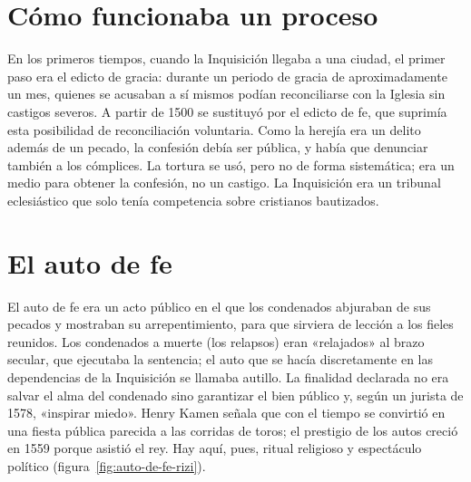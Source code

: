 \documentclass{book}
\begin{document}

\section{Cómo funcionaba un proceso}

En los primeros tiempos, cuando la Inquisición llegaba a una ciudad, el primer paso era el edicto de gracia: durante un periodo de gracia de aproximadamente un mes, quienes se acusaban a sí mismos podían reconciliarse con la Iglesia sin castigos severos. A partir de 1500 se sustituyó por el edicto de fe, que suprimía esta posibilidad de reconciliación voluntaria. Como la herejía era un delito además de un pecado, la confesión debía ser pública, y había que denunciar también a los cómplices. La tortura se usó, pero no de forma sistemática; era un medio para obtener la confesión, no un castigo. La Inquisición era un tribunal eclesiástico que solo tenía competencia sobre cristianos bautizados.


\section{El auto de fe}

El auto de fe era un acto público en el que los condenados abjuraban de sus pecados y mostraban su arrepentimiento, para que sirviera de lección a los fieles reunidos. Los condenados a muerte (los relapsos) eran «relajados» al brazo secular, que ejecutaba la sentencia; el auto que se hacía discretamente en las dependencias de la Inquisición se llamaba autillo. La finalidad declarada no era salvar el alma del condenado sino garantizar el bien público y, según un jurista de 1578, «inspirar miedo». Henry Kamen señala que con el tiempo se convirtió en una fiesta pública parecida a las corridas de toros; el prestigio de los autos creció en 1559 porque asistió el rey. Hay aquí, pues, ritual religioso y espectáculo político (figura~\ref{fig:auto-de-fe-rizi}).

\end{document}
